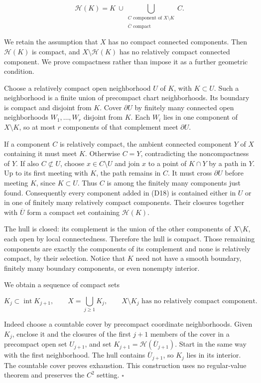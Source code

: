 \documentclass[
  11pt,
]{article}
\begin{document}
\[
 \mathcal H(K)=K\ \cup\!
    \bigcup_{\substack{C\text{ component of }X\setminus K\\
                              \overline C\text{ compact}}} C.    \tag{D18}
\]

We retain the assumption that \(X\) has no compact connected components.
Then \(\mathcal H(K)\) is compact, and \(X\setminus\mathcal H(K)\) has
no relatively compact connected component. We prove compactness rather
than impose it as a further geometric condition.

Choose a relatively compact open neighborhood \(U\) of \(K\), with
\(K\subset U\). Such a neighborhood is a finite union of precompact
chart neighborhoods. Its boundary is compact and disjoint from \(K\).
Cover \(\partial U\) by finitely many connected open neighborhoods
\(W_1,\ldots,W_r\) disjoint from \(K\). Each \(W_i\) lies in one
component of \(X\setminus K\), so at most \(r\) components of that
complement meet \(\partial U\).

If a component \(C\) is relatively compact, the ambient connected
component \(Y\) of \(X\) containing it must meet \(K\). Otherwise
\(C=Y\), contradicting the noncompactness of \(Y\). If also
\(C\not\subset U\), choose \(x\in C\setminus U\) and join \(x\) to a
point of \(K\cap Y\) by a path in \(Y\). Up to its first meeting with
\(K\), the path remains in \(C\). It must cross \(\partial U\) before
meeting \(K\), since \(K\subset U\). Thus \(C\) is among the finitely
many components just found. Consequently every component added in (D18)
is contained either in \(U\) or in one of finitely many relatively
compact components. Their closures together with \(\overline U\) form a
compact set containing \(\mathcal H(K)\).

The hull is closed: its complement is the union of the other components
of \(X\setminus K\), each open by local connectedness. Therefore the
hull is compact. Those remaining components are exactly the components
of its complement and none is relatively compact, by their selection.
Notice that \(K\) need not have a smooth boundary, finitely many
boundary components, or even nonempty interior.

We obtain a sequence of compact sets

\[
 K_j\subset\operatorname{int}K_{j+1},\qquad
 X=\bigcup_{j\geq1}K_j,\qquad
 X\setminus K_j\text{ has no relatively compact component}.    \tag{D19}
\]

Indeed choose a countable cover by precompact coordinate neighborhoods.
Given \(K_j\), enclose it and the closures of the first \(j+1\) members
of the cover in a precompact open set \(U_{j+1}\), and set
\(K_{j+1}=\mathcal H(\overline U_{j+1})\). Start in the same way with
the first neighborhood. The hull contains \(\overline U_{j+1}\), so
\(K_j\) lies in its interior. The countable cover proves exhaustion.
This construction uses no regular-value theorem and preserves the
\(C^2\) setting. \(\square\)
\end{document}
